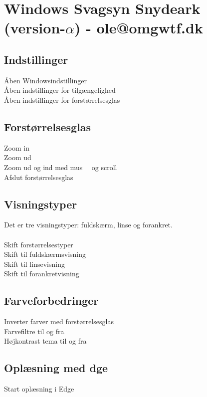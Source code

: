 \documentclass[a4paper, landscape, 11pt]{scrartcl}
\newcommand{\command}[2]{#1~\dotfill{}~#2\\} %
\begin{document}
\section*{Windows Svagsyn Snydeark (version-$\alpha$) - ole@omgwtf.dk}

\hrulefill{}

\begin{multicols}{2}

\subsection*{Indstillinger}
\command{Åben Windowsindstillinger}{}
\command{Åben indstillinger for tilgængelighed}{\keys{\faWindows + u}}
\command{Åben indstillinger for forstørrelsesglas}{\keys{\faWindows + \ctrl + m}}

\subsection*{Forstørrelsesglas}
\command{Zoom in}{\keys{\faWindows + {+}}}
\command{Zoom ud}{\keys{\faWindows + {-}}}
\command{Zoom ud og ind med mus}{\keys{\ctrl + \Alt} og scroll \faArrowsV}
\command{Afslut forstørrelsesglas}{\keys{\faWindows + \esc}}

\subsection*{Visningstyper}
Det er tre visningstyper: fuldskærm, linse og forankret.\\ \\
\command{Skift forstørrelsestyper}{}
\command{Skift til fuldskærmsvisning}{}
\command{Skift til linsevisning}{}
\command{Skift til forankretvisning}{}


\subsection*{Farveforbedringer}
\command{Inverter farver med forstørrelsesglas}{\keys{\ctrl + \Alt + i}}
\command{Farvefiltre til og fra}{}
\command{Højkontrast tema til og fra}{\keys{\shift + \Alt + PrtScn}}

\subsection*{Oplæsning med \faEdge dge}
\command{Start oplæsning i Edge}{}


\end{multicols}
\end{document}
